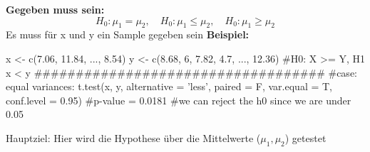 \large{\textbf{Gegeben muss sein:}}
\[
H_0: \mu_1 = \mu_2, \quad 
H_0: \mu_1 \leq \mu_2, \quad 
H_0: \mu_1 \geq \mu_2
\]
\textcolor{red}{\warning} Es muss für x und y ein Sample gegeben sein \textcolor{red}{\warning}
\large{\textbf{Beispiel:}}
\begin{comment}
\[
\begin{array}{|c|l|}
\hline
\textbf{Symbol} & \textbf{Bedeutung} \\
\hline
n_1,\,n_2 & \text{Stichprobengrößen} \\
\overline{X}_{(n_1)},\,\overline{Y}_{(n_2)} & \text{Sample Means} \\
S^2_{X,n_1},\, S^2_{Y,n_2} & \text{Sample SDs} \\
\hline
\end{array}
\]

\normalsize

\large{\textbf{Pooled Sample Variance:}}
\[
S_p^2 \;=\; 
\dfrac{(n_1 - 1)\,S_{X,n_1}^2 + (n_2 - 1)\,S_{Y,n_2}^2}
{n_1 + n_2 - 2}
\]

\large{\textbf{Teststatistik:}}
\[
T = \dfrac{\overline{X}_{(n_1)} - \overline{Y}_{(n_2)} \;-\; (\mu_1 - \mu_2)}
{S_p\,\sqrt{\dfrac{n_1 + n_2}{n_1\,n_2}}}
\;\;\sim t_{\,n_1 + n_2 - 2}
\]

\large{\textbf{Decision Rule \(R\):}}
\[
T \in R \implies \text{reject } H_0
\]

\large{\textbf{Rejection Region \(R\):}}
\[
\begin{array}{|c|c|}
\hline
H_0 & \text{Rejection Region } R \\ \hline
\mu_1 = \mu_2 
  & (-\infty,\,-t_{n_1+n_2-2,\,1-\tfrac{\alpha}{2}}) \cup (t_{n_1+n_2-2,\,1-\tfrac{\alpha}{2}},\,\infty) \\ \hline
\mu_1 \leq \mu_2 
  & (t_{n_1+n_2-2,\,1-\alpha},\,\infty) \\ \hline
\mu_1 \geq \mu_2 
  & (-\infty,\,-t_{n_1+n_2-2,\,1-\alpha}) \\ \hline
\end{array}
\]
\end{comment}
\begin{rcode}{1}
x <- c(7.06, 11.84, ..., 8.54)
y <- c(8.68, 6, 7.82, 4.7, ..., 12.36)
#H0: X >= Y, H1 x < y
###################################
#case: equal variances:
t.test(x, y, alternative = 'less', paired = F, var.equal = T, conf.level = 0.95)
#p-value = 0.0181
#we can reject the h0 since we are under 0.05
\end{rcode}
\normalsize
\begin{center}
\end{center}
\normalsize
Hauptziel: Hier wird die Hypothese über die
Mittelwerte ($\mu_1, \mu_2$) getestet
\normalsize
\begin{center}
\end{center}

